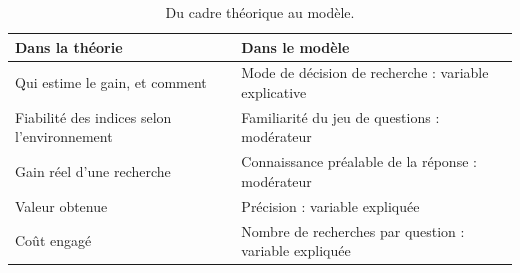 \documentclass[11pt,a4paper]{article}
\begin{document}
\begin{table}[ht]
\centering\small
\begin{tabular}{@{}p{5.6cm}p{7.4cm}@{}}
\toprule
Dans la théorie & Dans le modèle\\
\midrule
Qui estime le gain, et comment & Mode de décision de recherche : variable explicative\\
Fiabilité des indices selon l'environnement & Familiarité du jeu de questions : modérateur\\
Gain réel d'une recherche & Connaissance préalable de la réponse : modérateur\\
Valeur obtenue & Précision : variable expliquée\\
Coût engagé & Nombre de recherches par question : variable expliquée\\
\bottomrule
\end{tabular}
\caption{Du cadre théorique au modèle.}
\label{tab:passage}
\end{table}
\end{document}
